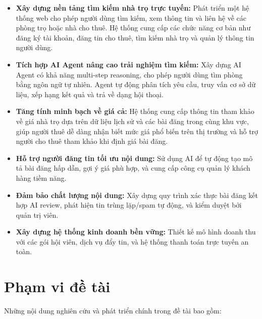 \begin{itemize}
    \item \textbf{Xây dựng nền tảng tìm kiếm nhà trọ trực tuyến:} Phát triển một hệ thống web cho phép người dùng tìm kiếm, xem thông tin và liên hệ về các phòng trọ hoặc nhà cho thuê. Hệ thống cung cấp các chức năng cơ bản như đăng ký tài khoản, đăng tin cho thuê, tìm kiếm nhà trọ và quản lý thông tin người dùng.
    \item \textbf{Tích hợp AI Agent nâng cao trải nghiệm tìm kiếm:} Xây dựng AI Agent có khả năng multi-step reasoning, cho phép người dùng tìm phòng bằng ngôn ngữ tự nhiên. Agent tự động phân tích yêu cầu, truy vấn cơ sở dữ liệu, xếp hạng kết quả và trả về dạng hội thoại.
    \item \textbf{Tăng tính minh bạch về giá cả:} Hệ thống cung cấp thông tin tham khảo về giá nhà trọ dựa trên dữ liệu lịch sử và các bài đăng trong cùng khu vực, giúp người thuê dễ dàng nhận biết mức giá phổ biến trên thị trường và hỗ trợ người cho thuê tham khảo khi định giá bài đăng.
    \item \textbf{Hỗ trợ người đăng tin tối ưu nội dung:} Sử dụng AI để tự động tạo mô tả bài đăng hấp dẫn, gợi ý giá phù hợp, và cung cấp công cụ quản lý khách hàng tiềm năng.
    \item \textbf{Đảm bảo chất lượng nội dung:} Xây dựng quy trình xác thực bài đăng kết hợp AI review, phát hiện tin trùng lặp/spam tự động, và kiểm duyệt bởi quản trị viên.
    \item \textbf{Xây dựng hệ thống kinh doanh bền vững:} Thiết kế mô hình doanh thu với các gói hội viên, dịch vụ đẩy tin, và hệ thống thanh toán trực tuyến an toàn.
\end{itemize}

\section{Phạm vi đề tài}

Những nội dung nghiên cứu và phát triển chính trong đề tài bao gồm:

\FloatBarrier
